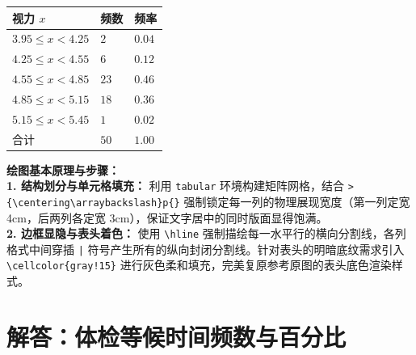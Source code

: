 \vspace{0.2cm}
\begin{center}
\renewcommand{\arraystretch}{1.5}
\begin{tabular}{|>{\centering\arraybackslash}p{4cm}|>{\centering\arraybackslash}p{3cm}|>{\centering\arraybackslash}p{3cm}|}
  \hline
  \cellcolor{gray!15} 视力 $x$ & \cellcolor{gray!15} 频数 & \cellcolor{gray!15} 频率 \\
  \hline
  $3.95 \leqslant x < 4.25$ & $2$ & $0.04$ \\
  \hline
  \textbf{\textcolor{red!70!black}{$4.25 \leqslant x < 4.55$}} & $6$ & $0.12$ \\
  \hline
  $4.55 \leqslant x < 4.85$ & $23$ & \textbf{\textcolor{red!70!black}{$0.46$}} \\
  \hline
  $4.85 \leqslant x < 5.15$ & \textbf{\textcolor{red!70!black}{$18$}} & \textbf{\textcolor{red!70!black}{$0.36$}} \\
  \hline
  $5.15 \leqslant x < 5.45$ & $1$ & $0.02$ \\
  \hline
  合计 & \textbf{\textcolor{red!70!black}{$50$}} & $1.00$ \\
  \hline
\end{tabular}
\end{center}

\vspace{0.6cm}

{\small\color{blue!70!black}
\textbf{绘图基本原理与步骤：}\\
\textbf{1. 结构划分与单元格填充：} 利用 \texttt{tabular} 环境构建矩阵网格，结合 \texttt{>\{\textbackslash centering\textbackslash arraybackslash\}p\{\}} 强制锁定每一列的物理展现宽度（第一列定宽 4cm，后两列各定宽 3cm），保证文字居中的同时版面显得饱满。\\
\textbf{2. 边框显隐与表头着色：} 使用 \texttt{\textbackslash hline} 强制描绘每一水平行的横向分割线，各列格式中间穿插 \texttt{|} 符号产生所有的纵向封闭分割线。针对表头的明暗底纹需求引入 \texttt{\textbackslash cellcolor\{gray!15\}} 进行灰色柔和填充，完美复原参考原图的表头底色渲染样式。
}

\newpage



\newpage

\section{解答：体检等候时间频数与百分比}

